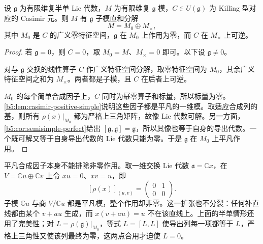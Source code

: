 \begin{lemma}\label{b5:lem:casimir-zero-primary}
	设 \(\mathfrak g\) 为有限维复半单 Lie 代数，\(M\) 为有限维复 \(\mathfrak g\) 模，\(C\in U(\mathfrak g)\) 为 Killing 型对应的 Casimir 元。则 \(M\) 有 \(\mathfrak g\) 子模直和分解
	\[
		M=M_0\oplus M_\times,
	\]
	其中 \(M_0\) 是 \(C\) 的广义零特征空间，\(\mathfrak g\) 在 \(M_0\) 上作用为零，而 \(C\) 在 \(M_\times\) 上可逆。
\end{lemma}
\begin{proof}
	若 \(\mathfrak g=0\)，则 \(C=0\)，取 \(M_0=M\)、\(M_\times=0\) 即可。以下设 \(\mathfrak g\ne0\)。

	对与 \(\mathfrak g\) 交换的线性算子 \(C\) 作广义特征空间分解，取零特征空间为 \(M_0\)，其余广义特征空间之和为 \(M_\times\)。两者都是子模，且 \(C\) 在后者上可逆。

	\(M_0\) 的每个简单合成因子上，\(C\) 同时为幂零算子和标量，所以标量为零。\cref{b5:lem:casimir-positive-simple}说明这些因子都是平凡的一维模。取适应合成列的基，则所有 \(\rho(x)|_{M_0}\) 都为严格上三角矩阵，故像 Lie 代数可解。另一方面，\cref{b5:cor:semisimple-perfect}给出 \([\mathfrak g,\mathfrak g]=\mathfrak g\)，所以其像也等于自身的导出代数。一个既可解又等于自身导出代数的 Lie 代数只能为零。于是 \(\mathfrak g\) 在 \(M_0\) 上平凡作用。
\end{proof}

平凡合成因子本身不能排除非零作用。取一维交换 Lie 代数 \(\mathfrak a=\mathbb Cx\)，在 \(V=\mathbb Cu\oplus\mathbb Cv\) 上令 \(xu=0\)、\(xv=u\)，即
\[
	[\rho(x)]_{(u,v)}=\begin{pmatrix}0&1\\0&0\end{pmatrix}.
\]
子模 \(\mathbb Cu\) 与商 \(V/\mathbb Cu\) 都是平凡模，整个作用却非零。这一扩张也不分裂：任何补直线都由某个 \(v+au\) 生成，而 \(x(v+au)=u\) 不在该直线上。上面的半单情形还用了完美性；对 \(L=\rho(\mathfrak g)|_{M_0}\)，等式 \(L=[L,L]\) 使导出列每一项都等于 \(L\)，严格上三角性又使该列最终为零，这两点合用才迫使 \(L=0\)。

